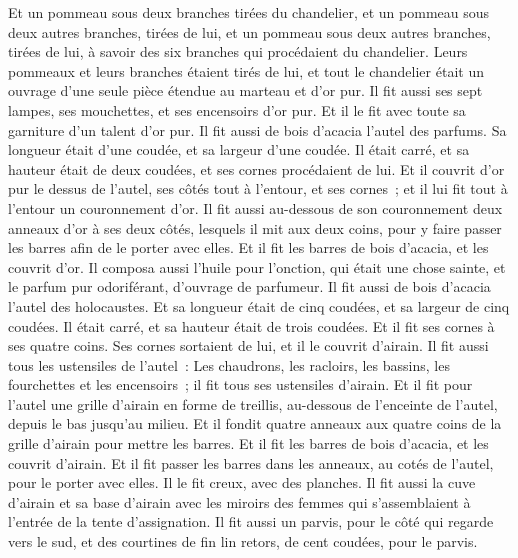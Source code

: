 \begin{multicols}{2}
Et un pommeau sous deux branches tirées du chandelier, et un pommeau sous deux autres branches, tirées de lui, et un pommeau sous deux autres branches, tirées de lui, à savoir des six branches qui procédaient du chandelier.
Leurs pommeaux et leurs branches étaient tirés de lui, et tout le chandelier était un ouvrage d'une seule pièce étendue au marteau et d'or pur.
Il fit aussi ses sept lampes, ses mouchettes, et ses encensoirs d'or pur.
Et il le fit avec toute sa garniture d'un talent d'or pur.
Il fit aussi de bois d'acacia l'autel des parfums. Sa longueur était d'une coudée, et sa largeur d'une coudée. Il était carré, et sa hauteur était de deux coudées, et ses cornes procédaient de lui.
 Et il couvrit d'or pur le dessus de l'autel, ses côtés tout à l'entour, et ses cornes~; et il lui fit tout à l'entour un couronnement d'or.
Il fit aussi au-dessous de son couronnement deux anneaux d'or à ses deux côtés, lesquels il mit aux deux coins, pour y faire passer les barres afin de le porter avec elles.
Et il fit les barres de bois d'acacia, et les couvrit d'or.
Il composa aussi l'huile pour l'onction, qui était une chose sainte, et le parfum pur odoriférant, d'ouvrage de parfumeur.
\VerseOne{}Il fit aussi de bois d'acacia l'autel des holocaustes. Et sa longueur était de cinq coudées, et sa largeur de cinq coudées. Il était carré, et sa hauteur était de trois coudées.
Et il fit ses cornes à ses quatre coins. Ses cornes sortaient de lui, et il le couvrit d'airain.
Il fit aussi tous les ustensiles de l'autel~: Les chaudrons, les racloirs, les bassins, les fourchettes et les encensoirs~; il fit tous ses ustensiles d'airain.
Et il fit pour l'autel une grille d'airain en forme de treillis, au-dessous de l'enceinte de l'autel, depuis le bas jusqu'au milieu.
Et il fondit quatre anneaux aux quatre coins de la grille d'airain pour mettre les barres.
 Et il fit les barres de bois d'acacia, et les couvrit d'airain.
Et il fit passer les barres dans les anneaux, au cotés de l'autel, pour le porter avec elles. Il le fit creux, avec des planches.
Il fit aussi la cuve d'airain et sa base d'airain avec les miroirs des femmes qui s'assemblaient à l'entrée de la tente d'assignation.
Il fit aussi un parvis, pour le côté qui regarde vers le sud, et des courtines de fin lin retors, de cent coudées, pour le parvis.

\end{multicols}
